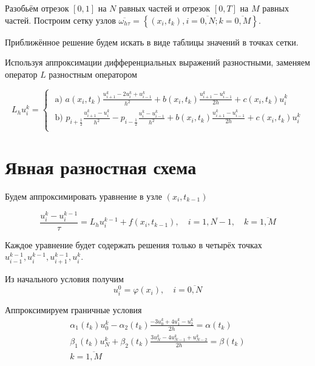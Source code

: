 \documentclass[a4paper,12pt]{article}
\begin{document}
    Разобьём отрезок $[0, 1]$ на $N$ равных частей и отрезок $[0, T]$ на $M$ равных частей. Построим сетку узлов $\overline{\omega_{h \tau}}=\left\{\left(x_{i}, t_{k}\right), i=\overline{0, N} ; k=\overline{0, M}\right\}$. 

    Приближённое решение будем искать в виде таблицы значений в точках сетки.

    Используя аппроксимации дифференциальных выражений разностными, заменяем оператор $L$ разностным оператором

    $$L_{h} u_{i}^{k}=
    \begin{cases}

        \text { a) } a\left(x_{i}, t_{k}\right) \frac{u_{i+1}^{k}-2 u_{i}^{k}+u_{i-1}^{k}}{h^{2}}+b\left(x_{i}, t_{k}\right) \frac{u_{i+1}^{k}-u_{i-1}^{k}}{2 h}+c\left(x_{i}, t_{k}\right) u_{i}^{k}
\       \\
        \text { b) } p_{i+\frac{1}{2}} \frac{u_{i+1}^{k}-u_{i}^{k}}{h^{2}}-p_{i-\frac{1}{2}} \frac{u_{i}^{k}-u_{i-1}^{k}}{h^{2}}+b\left(x_{i}, t_{k}\right) \frac{u_{i+1}^{k}-u_{i-1}^{k}}{2 h}+c\left(x_{i}, t_{k}\right) u_{i}^{k}
       \\
    \end{cases}$$

\section{Явная разностная схема}

    Будем аппроксимировать уравнение в узле $(x_i, t_{k-1})$

    $$\frac{u_{i}^{k}-u_{i}^{k-1}}{\tau}=L_{h} u_{i}^{k-1}+f\left(x_{i}, t_{k-1}\right), \quad i=\overline{1, N-1}, \quad k=\overline{1, M}$$

    Каждое уравнение будет содержать решения только в четырёх точках $u_{i-1}^{k-1}, u_{i}^{k-1}, u_{i+1}^{k-1}, u_{i}^{k}$.

    Из начального условия получим
    $$u_{i}^{0}=\varphi\left(x_{i}\right), \quad i=\overline{0, N}$$

    Аппроксимируем граничные условия
    $$\begin{array}{c}
\alpha_{1}\left(t_{k}\right) u_{0}^{k}-\alpha_{2}\left(t_{k}\right) \frac{-3 u_{0}^{k}+4 u_{1}^{k}-u_{2}^{k}}{2 h}=\alpha\left(t_{k}\right) \\
\beta_{1}\left(t_{k}\right) u_{N}^{k}+\beta_{2}\left(t_{k}\right) \frac{3 u_{N}^{k}-4 u_{N-1}^{k}+u_{N-2}^{k}}{2 h}=\beta\left(t_{k}\right) \\
k=\overline{1, M}
\end{array}$$
\end{document}
